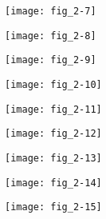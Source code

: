 \begin{figure}[p]
   \centering
   \texttt{[image: fig\_2-7]}
   \caption[{\lipsum*[27][1]}]{\lipsum*[27][1-2]}
   \label{fig:fig_2-7}
\end{figure}

\begin{figure}[p]
   \centering
   \texttt{[image: fig\_2-8]}
   \caption[{\lipsum*[28][1]}]{\lipsum*[28][1-2]}
   \label{fig:fig_2-8}
\end{figure}

\begin{figure}[p]
   \centering
   \texttt{[image: fig\_2-9]}
   \caption[{\lipsum*[29][1]}]{\lipsum*[29][1-2]}
   \label{fig:fig_2-9}
\end{figure}

\begin{figure}[p]
   \centering
   \texttt{[image: fig\_2-10]}
   \caption[{\lipsum*[30][1]}]{\lipsum*[30][1-2]}
   \label{fig:fig_2-10}
\end{figure}

\begin{figure}[p]
   \centering
   \texttt{[image: fig\_2-11]}
   \caption[{\lipsum*[31][1]}]{\lipsum*[31][1-2]}
   \label{fig:fig_2-11}
\end{figure}

\begin{figure}[p]
   \centering
   \texttt{[image: fig\_2-12]}
   \caption[{\lipsum*[32][1]}]{\lipsum*[32][1-2]}
   \label{fig:fig_2-12}
\end{figure}

\begin{figure}[p]
   \centering
   \texttt{[image: fig\_2-13]}
   \caption[{\lipsum*[33][1]}]{\lipsum*[33][1-2]}
   \label{fig:fig_2-13}
\end{figure}

\begin{figure}[p]
   \centering
   \texttt{[image: fig\_2-14]}
   \caption[{\lipsum*[34][1]}]{\lipsum*[34][1-2]}
   \label{fig:fig_2-14}
\end{figure}

\begin{figure}[p]
   \centering
   \texttt{[image: fig\_2-15]}
   \caption[{\lipsum*[35][1]}]{\lipsum*[35][1-2]}
   \label{fig:fig_2-15}
\end{figure}
